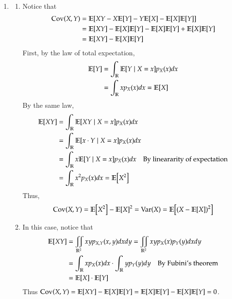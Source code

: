 \documentclass[12pt]{article}
\theoremstyle{definitionstyle}
\def\mbb#1{\mathbb{#1}}
\def \R{\mbb{R}}
\newcommand{\E}{\mathbb{E}\qty}
\newcommand{\Cov}{\mathrm{Cov}\qty}
\newcommand{\Var}{\mathrm{Var}\qty}
\begin{document}
\begin{enumerate}[leftmargin=\labelsep]
		\item 
		\begin{enumerate}
			\item Notice that
			\begin{align*}
				\Cov(X,Y) &= \E[XY - X\E[Y] - Y\E[X] - \E[X]\E[Y]] 
				\\&= \E[XY] - \E[X]\E[Y] - \E[X]\E[Y] + \E[X]\E[Y] 
				\\&= \E[XY] - \E[X]\E[Y]
			\end{align*}
			First, by the law of total expectation,
			\begin{align*}
				\E[Y] &= \int_\R \E[Y \mid X = x] p_X(x)dx
				\\&= \int_\R x  p_X(x)dx = \E[X]
			\end{align*}
			By the same law,
			\begin{align*}
				\E[XY] &= \int_\R \E[XY \mid X = x]p_X(x)dx
				\\&= \int_\R \E[x \cdot Y \mid X = x] p_X(x)dx 
				\\&= \int_\R x\E[Y \mid X = x] p_X(x)dx \quad \text{By lineararity of expectation} 
				\\&= \int_\R x^2 p_X(x)dx = \E[X^2]
			\end{align*}
			Thus,
			\begin{align*}
				\Cov(X,Y) = \E[X^2] - \E[X]^2 = \Var(X) = \E[(X-\E[X])^2]
			\end{align*}
			\item In this case, notice that
			\begin{align*}
				\E[XY] &= \iint_{\R^2} xyp_{X,Y}(x,y)dxdy = \iint_{\R^2} xy p_X(x)p_Y(y)dxdy 
				\\&= \int_\R xp_X(x)dx \cdot \int_\R yp_Y(y)dy \quad \text{By Fubini's theorem}
				\\&= \E[X] \cdot \E[Y]
			\end{align*}
			Thus $\Cov(X,Y) = \E[XY] - \E[X]\E[Y] = \E[X]\E[Y] - \E[X]\E[Y] = 0$.
		\end{enumerate}
	

\end{enumerate}
\end{document}
